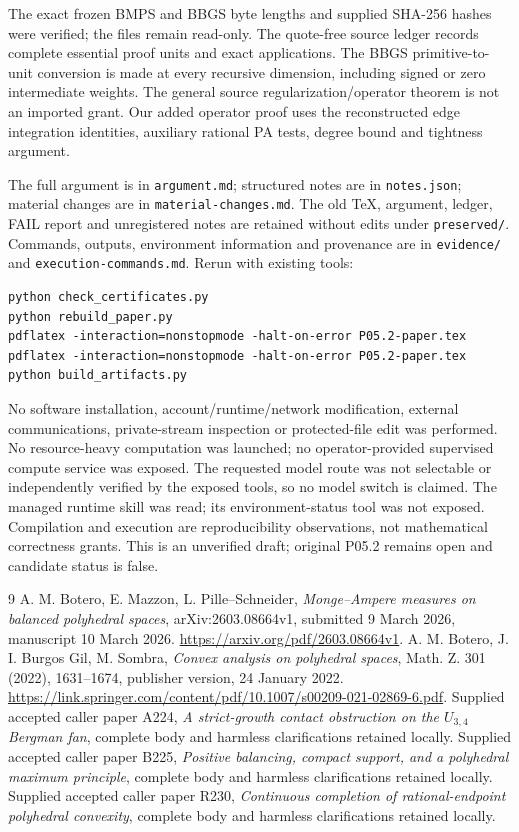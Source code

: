 \documentclass[11pt]{article}
\begin{document}
The exact frozen BMPS and BBGS byte lengths and supplied SHA-256 hashes
were verified; the files remain read-only. The quote-free source ledger
records complete essential proof units and exact applications. The
BBGS primitive-to-unit conversion is made at every recursive dimension,
including signed or zero intermediate weights. The general source
regularization/operator theorem is not an imported grant. Our added
operator proof uses the reconstructed edge integration identities,
auxiliary rational PA tests, degree bound and tightness argument.

The full argument is in \texttt{argument.md}; structured notes are in
\texttt{notes.json}; material changes are in \texttt{material-changes.md}.
The old TeX, argument, ledger, FAIL report and unregistered notes are
retained without edits under \texttt{preserved/}. Commands, outputs,
environment information and provenance are in \texttt{evidence/} and
\texttt{execution-commands.md}. Rerun with existing tools:
\begin{verbatim}
python check_certificates.py
python rebuild_paper.py
pdflatex -interaction=nonstopmode -halt-on-error P05.2-paper.tex
pdflatex -interaction=nonstopmode -halt-on-error P05.2-paper.tex
python build_artifacts.py
\end{verbatim}
No software installation, account/runtime/network modification,
external communications, private-stream inspection or protected-file
edit was performed. No resource-heavy computation was launched; no
operator-provided supervised compute service was exposed. The requested
model route was not selectable or independently verified by the exposed
tools, so no model switch is claimed. The managed runtime skill was read;
its environment-status tool was not exposed. Compilation and execution
are reproducibility observations, not mathematical correctness grants.
This is an unverified draft; original P05.2 remains open and candidate
status is false.

\begin{thebibliography}{9}
 A. M. Botero, E. Mazzon, L. Pille--Schneider,
\emph{Monge--Ampere measures on balanced polyhedral spaces},
arXiv:2603.08664v1, submitted 9 March 2026, manuscript 10 March 2026.
\url{https://arxiv.org/pdf/2603.08664v1}.
 A. M. Botero, J. I. Burgos Gil, M. Sombra,
\emph{Convex analysis on polyhedral spaces}, Math. Z. 301 (2022),
1631--1674, publisher version, 24 January 2022.
\url{https://link.springer.com/content/pdf/10.1007/s00209-021-02869-6.pdf}.
 Supplied accepted caller paper A224,
\emph{A strict-growth contact obstruction on the \(U_{3,4}\) Bergman fan},
complete body and harmless clarifications retained locally.
 Supplied accepted caller paper B225,
\emph{Positive balancing, compact support, and a polyhedral maximum
principle}, complete body and harmless clarifications retained locally.
 Supplied accepted caller paper R230,
\emph{Continuous completion of rational-endpoint polyhedral convexity},
complete body and harmless clarifications retained locally.
\end{thebibliography}
\end{document}
